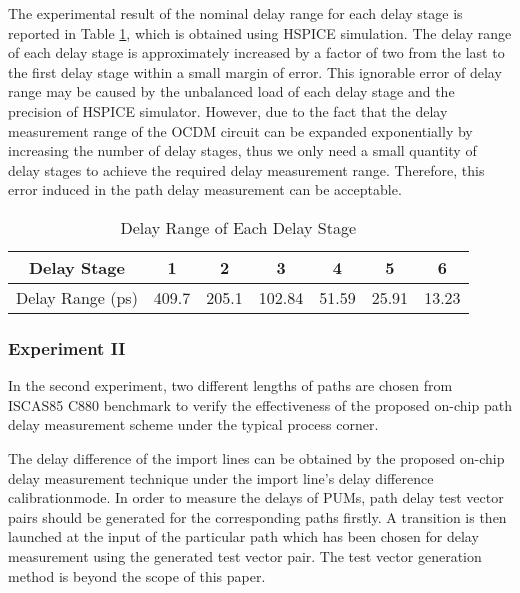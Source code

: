 The experimental result of the nominal delay range for each delay stage is reported in Table \ref{tab:delay-range}, which is obtained using HSPICE simulation. The delay range of each delay stage is approximately increased by a factor of two from the last to the first delay stage within a small margin of error. This ignorable error of delay range may be caused by the unbalanced load of each delay stage and the precision of HSPICE simulator. However, due to the fact that the delay measurement range of the OCDM circuit can be expanded exponentially by increasing the number of delay stages, thus we only need a small quantity of delay stages to achieve the required delay measurement range. Therefore, this error induced in the path delay measurement can be acceptable.

\begin{table}[h]
    \caption{Delay Range of Each Delay Stage} \label{tab:delay-range}
    \begin{tabular}{c|cccccc}
        \hline
         Delay Stage & 1 & 2 & 3 & 4 & 5 & 6 \\ \hline
         Delay Range (ps) & 409.7 & 205.1 & 102.84 & 51.59 & 25.91 & 13.23 \\ \hline
    \end{tabular}
\end{table}

\subsubsection{Experiment II}
In the second experiment, two different lengths of paths are chosen from ISCAS85 C880 benchmark to verify the effectiveness of the proposed on-chip path delay measurement scheme under the typical process corner.

The delay difference of the import lines can be obtained by the proposed on-chip delay measurement technique under the import line’s delay difference calibrationmode. In order to measure the delays of PUMs, path delay test vector pairs should be generated for the corresponding paths firstly. A transition is then launched at the input of the particular path which has been chosen for delay measurement using the generated test vector pair. The test vector generation method is beyond the scope of this paper.


